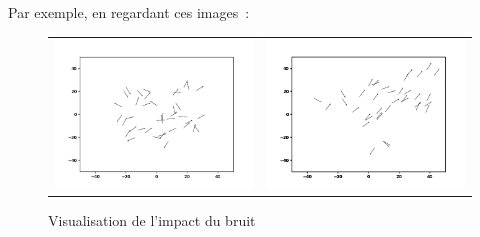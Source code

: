 \documentclass[french, a4paper, 12pt, openany]{report}
\begin{document}
Par exemple, en regardant ces images~:


   
	\begin{figure}[!h]
		\centering
		\begin{tabular}{cc}
			\includegraphics[width=8cm]{images/image_3.png} & \includegraphics[width=8cm]{images/image_4.png} \\
		\end{tabular}
		\caption{Visualisation de l'impact du bruit}
	\end{figure} 


   
   
   
 
    
      

   
	
\end{document}
